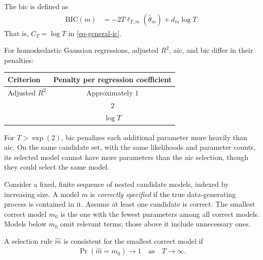 \documentclass[a4paper,12pt]{article}
\begin{document}
\begin{definition}\label{def-bic}
	The \gls{bic} is defined as
	\begin{align}
		\mathrm{BIC}(m)&=-2T\ell_{T,m}(\widehat\theta_m)+d_m\log T.
	\end{align}
	That is, $C_T=\log T$ in \eqref{eq-general-ic}.
\end{definition}

\begin{remark}[Penalties]
	For homoskedastic Gaussian regressions, adjusted $R^2$, \gls{aic}, and \gls{bic}
	differ in their penalties:
	\begin{center}
		\begin{tabular}{lc}
			\toprule
			Criterion & Penalty per regression coefficient\\
			\midrule
			Adjusted $R^2$ & Approximately $1$\\
			\glsentryshort{aic} & $2$\\
			\glsentryshort{bic} & $\log T$\\
			\bottomrule
		\end{tabular}
	\end{center}
\end{remark}

\begin{remark}
	For $T>\exp(2)$,
	\gls{bic} penalizes each additional parameter more heavily than \gls{aic}.
    On the same candidate set, with the same likelihoods and parameter counts,
    its selected model cannot have more parameters than the \gls{aic} selection,
    though they could select the same model.
\end{remark}

\begin{definition}
	Consider a fixed, finite sequence of nested candidate models, indexed by increasing size.
	A model $m$ is \emph{correctly specified} if the true data-generating process is contained in it.
	Assume at least one candidate is correct.
	The smallest correct model $m_0$ is the one with the fewest parameters among all correct models.
	Models below $m_0$ omit relevant terms; those above it include unnecessary ones.
\end{definition}

\begin{definition}
    A selection rule $\widehat m$ is consistent for the smallest correct model if
    \begin{align}
        \Pr(\widehat m=m_0)\to1
        \quad\text{as}\quad
		T\to\infty.
    \end{align}
\end{definition}
\end{document}
